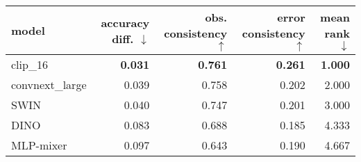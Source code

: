 \begin{tabular}{lrrrr}
\toprule
          model & accuracy diff. $\downarrow$ & obs. consistency $\uparrow$ & error consistency $\uparrow$ & mean rank $\downarrow$ \\
\midrule
       clip\_16 &              \textbf{0.031} &              \textbf{0.761} &               \textbf{0.261} &         \textbf{1.000} \\
convnext\_large &                       0.039 &                       0.758 &                        0.202 &                  2.000 \\
           SWIN &                       0.040 &                       0.747 &                        0.201 &                  3.000 \\
           DINO &                       0.083 &                       0.688 &                        0.185 &                  4.333 \\
      MLP-mixer &                       0.097 &                       0.643 &                        0.190 &                  4.667 \\
\bottomrule
\end{tabular}

